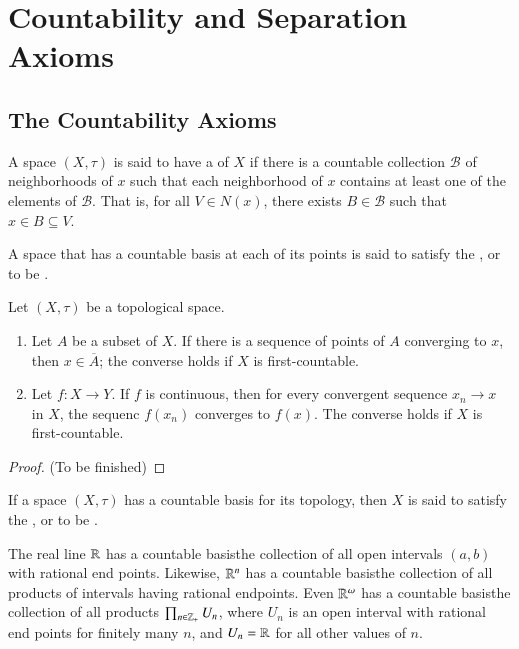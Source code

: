 \documentclass[12pt, a4paper, oneside, openright, titlepage]{book}
\begin{document}
\chapter{\textsection Countability and Separation Axioms}


\section{The Countability Axioms}

\begin{defn}
    A space $(X,\tau)$ is said to have a  of $X$ if there is a countable collection $\mathcal{B}$ of neighborhoods of $x$ such that each neighborhood of $x$ contains at least one of the elements of $\mathcal{B}$. That is, for all $V \in N(x)$, there exists $B \in \mathcal{B}$ such that $x \in B \subseteq V$.


    A space that has a countable basis at each of its points is said to satisfy the , or to be .
\end{defn}

\begin{thm}
    Let $(X,\tau)$ be a topological space. \begin{enumerate}
        \item Let $A$ be a subset of $X$. If there is a sequence of points of $A$ converging to $x$, then $x \in \overline{A}$; the converse holds if $X$ is first-countable.
        \item Let $f:X\rightarrow Y$. If $f$ is continuous, then for every convergent sequence $x_n\rightarrow x$ in $X$, the sequenc $f(x_n)$ converges to $f(x)$. The converse holds if $X$ is first-countable.
    \end{enumerate}
\end{thm}
\begin{proof}
    (To be finished)
\end{proof}


\begin{defn}
    If a space $(X,\tau)$ has a countable basis for its topology, then $X$ is said to satisfy the , or to be .
\end{defn}

\begin{eg}
    The real line $\mathbb R$ has a countable basis\textendash the collection of all open intervals $(a,b)$ with rational end points. Likewise, $\mathbb R^n$ has a countable basis\textendash the collection of all products of intervals having rational endpoints. Even $\mathbb R^{\omega}$ has a countable basis\textendash the collection of all products $\prod_{n\in\mathbb Z_+}U_n$, where $U_n$ is an open interval with rational end points for finitely many $n$, and $U_n = \mathbb R$ for all other values of $n$.
\end{eg}
\end{document}

